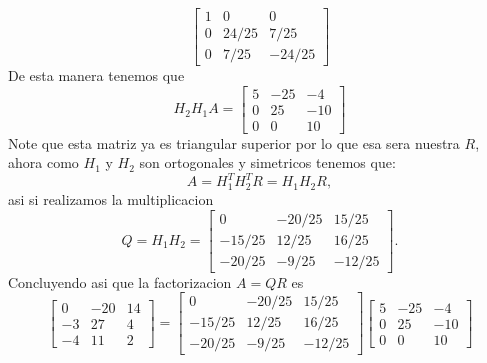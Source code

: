 \begin{enumerate}
\begin{solution}
$$\begin{bmatrix}
                1&0&0\\
                0&24/25&7/25\\
                0&7/25&-24/25
            \end{bmatrix}$$
            De esta manera tenemos que
            $$H_2H_1A=\begin{bmatrix}
                5& -25& -4\\
                0& 25& -10\\
                0& 0& 10
            \end{bmatrix}$$
            Note que esta matriz ya es triangular superior por lo que esa sera nuestra $R$, ahora como $H_1$ y $H_2$ son ortogonales y simetricos tenemos que:
            $$A=H_1^TH_2^TR=H_1H_2R,$$
            asi si realizamos la multiplicacion
            $$Q=H_1H_2=\begin{bmatrix}
                0&-20/25&15/25\\
                -15/25&12/25&16/25\\
                -20/25&-9/25&-12/25
            \end{bmatrix}.$$
            Concluyendo asi que la factorizacion $A=QR$ es
            $$\begin{bmatrix} 0 & -20 & 14 \\ -3 & 27 & 4 \\ -4 & 11 & 2 \end{bmatrix}=\begin{bmatrix}
                0&-20/25&15/25\\
                -15/25&12/25&16/25\\
                -20/25&-9/25&-12/25
            \end{bmatrix}\begin{bmatrix}
                5& -25& -4\\
                0& 25& -10\\
                0& 0& 10
            \end{bmatrix}$$


\end{solution}
\end{enumerate}
